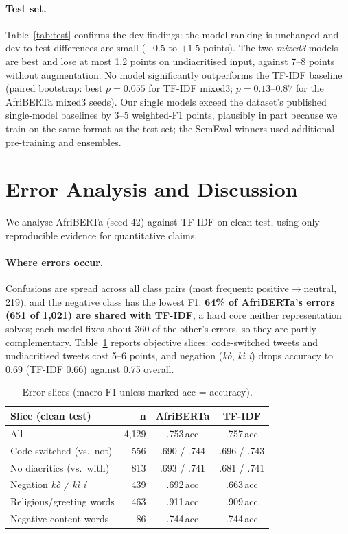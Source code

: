 \documentclass[11pt]{article}
\begin{document}
\paragraph{Test set.} Table~\ref{tab:test} confirms the dev findings: the model ranking is unchanged and dev-to-test differences are small ($-0.5$ to $+1.5$ points). The two \emph{mixed3} models are best and lose at most 1.2 points on undiacritised input, against 7--8 points without augmentation. No model significantly outperforms the TF-IDF baseline (paired bootstrap: best $p=0.055$ for TF-IDF mixed3; $p=0.13$--$0.87$ for the AfriBERTa mixed3 seeds). Our single models exceed the dataset's published single-model baselines by 3--5 weighted-F1 points, plausibly in part because we train on the same format as the test set; the SemEval winners used additional pre-training and ensembles.

\section{Error Analysis and Discussion}\label{sec:errors}
We analyse AfriBERTa (seed 42) against TF-IDF on clean test, using only reproducible evidence for quantitative claims.

\paragraph{Where errors occur.} Confusions are spread across all class pairs (most frequent: positive$\rightarrow$neutral, 219), and the negative class has the lowest F1. \textbf{64\% of AfriBERTa's errors (651 of 1,021) are shared with TF-IDF}, a hard core neither representation solves; each model fixes about 360 of the other's errors, so they are partly complementary. Table~\ref{tab:slices} reports objective slices: code-switched tweets and undiacritised tweets cost 5--6 points, and negation (\emph{kò}, \emph{kì í}) drops accuracy to 0.69 (TF-IDF 0.66) against 0.75 overall.

\begin{table}[t]
\centering\small
\setlength{\tabcolsep}{3pt}
\begin{tabular}{lrcc}
\toprule
Slice (clean test) & n & AfriBERTa & TF-IDF \\
\midrule
All & 4,129 & .753\,acc & .757\,acc \\
Code-switched (vs.\ not) & 556 & .690 / .744 & .696 / .743 \\
No diacritics (vs.\ with) & 813 & .693 / .741 & .681 / .741 \\
Negation \emph{kò / kì í} & 439 & .692\,acc & .663\,acc \\
Religious/greeting words & 463 & .911\,acc & .909\,acc \\
Negative-content words & 86 & .744\,acc & .744\,acc \\
\bottomrule
\end{tabular}
\caption{Error slices (macro-F1 unless marked acc = accuracy).}
\label{tab:slices}
\end{table}
\end{document}

